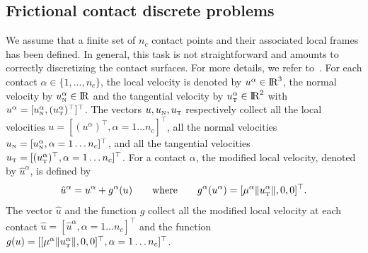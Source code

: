 {%



\subsection{Frictional contact discrete problems}


 We assume that a finite set of $n_c$ contact points and their associated local frames has been defined.
 In general, this task is not straightforward and amounts to correctly discretizing  the contact surfaces. For more details, we refer to~\cite{Wriggers2006,Laursen2003}.
%
For each contact $\alpha \in \{1,\ldots, n_c\}$, the local velocity is denoted by $u^\alpha \in \mathrm{I\!R}^3$, the normal velocity by $u_{\hbox{\tiny{N}}}^{\alpha}\in \mathrm{I\!R}$ and the tangential velocity by $u_{\hbox{\tiny{T}}}^\alpha\in\mathrm{I\!R}^2$ with $u^\alpha = [u^\alpha_{{\hbox{\tiny{N}}}}, (u^\alpha_{{\hbox{\tiny{T}}}})^\top]^\top$.
The vectors $u, u_{\hbox{\tiny{N}}}, u_{\hbox{\tiny{T}}}$ respectively collect all the local velocities
$u = [(u^\alpha)^\top, \alpha = 1\ldots n_c]^\top$,
all the normal velocities
$u_{\hbox{\tiny{N}}} = [ u^\alpha_{{\hbox{\tiny{N}}}}, \alpha = 1\ldots n_c]^\top$,
and all the  tangential velocities
$u_{\hbox{\tiny{T}}} = [(u^\alpha_{{\hbox{\tiny{T}}}})^\top, \alpha = 1\ldots n_c]^\top$.
For a contact $\alpha $, the modified local velocity, denoted by $\hat u^\alpha $, is defined by
\begin{equation}
  \hat u^\alpha = u^\alpha + g^\alpha(u)\qquad\text{where}\qquad
 g^\alpha(u^\alpha) =  [\mu^\alpha  \|u^\alpha_\t\|, 0, 0 ]^\top.
  \label{eq:modified}
\end{equation}
The vector $\hat u$ and the function $g$ collect all the modified local velocity at each contact $\hat u = [\hat u^\alpha, \alpha = 1\ldots n_c]^\top$ and the function $g(u) = [[\mu^\alpha  \|u^\alpha_{\hbox{\tiny{T}}}\|, 0, 0]^\top, \alpha = 1\ldots n_c]^\top$.

}
